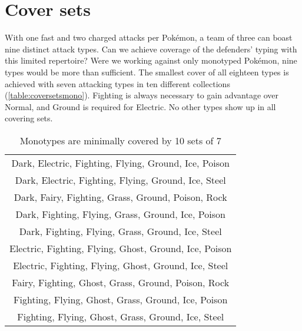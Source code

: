 \section{Cover sets\label{sec:coversets}}
With one fast and two charged attacks per Pokémon, a team of three can boast nine distinct attack types.
Can we achieve coverage of the defenders' typing with this limited repertoire?
Were we working against only monotyped Pokémon, nine types would be more than sufficient.
The smallest cover of all eighteen types is achieved with seven attacking types in
  ten different collections (\autoref{table:coversetsmono}).
Fighting is always necessary to gain advantage over Normal, and Ground is required for Electric.
No other types show up in all covering sets.
\begin{table}
\centering
\begin{tabular}{c}
Dark, Electric, Fighting, Flying, Ground, Ice, Poison\\
Dark, Electric, Fighting, Flying, Ground, Ice, Steel\\
Dark, Fairy, Fighting, Grass, Ground, Poison, Rock\\
Dark, Fighting, Flying, Grass, Ground, Ice, Poison\\
Dark, Fighting, Flying, Grass, Ground, Ice, Steel\\
Electric, Fighting, Flying, Ghost, Ground, Ice, Poison\\
Electric, Fighting, Flying, Ghost, Ground, Ice, Steel\\
Fairy, Fighting, Ghost, Grass, Ground, Poison, Rock\\
Fighting, Flying, Ghost, Grass, Ground, Ice, Poison\\
Fighting, Flying, Ghost, Grass, Ground, Ice, Steel\\
\end{tabular}
\caption{Monotypes are minimally covered by 10 sets of 7\label{table:coversetsmono}}
\end{table}

